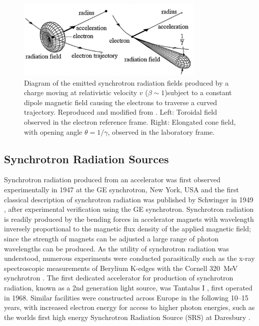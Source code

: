 \documentclass[../main.tex]{subfiles}
\begin{document}
\begin{figure}[!h]
\centering
\includegraphics[width=0.8\textwidth]{Figures/Introduction/Synchrotron_Radiation_Diagram.pdf}
\caption{Diagram of the emitted synchrotron radiation fields produced by a charge moving at relativistic velocity $v$ ($\beta\sim 1$)subject to a constant dipole magnetic field causing the electrons to traverse a curved trajectory. Reproduced and modified from \cite{eberhardt2015synchrotron}. Left: Toroidal field observed in the electron reference frame. Right: Elongated cone field, with opening angle $\theta = 1/\gamma$, observed in the laboratory frame.}
\label{fig:synchrotron_radiation_diagram}
\end{figure}

\subsection{Synchrotron Radiation Sources}

Synchrotron radiation produced from an accelerator was first observed experimentally in 1947 at the GE synchrotron, New York, USA \cite{elder1948radiation} and the first classical description of synchrotron radiation was published by Schwinger in 1949 \cite{schwinger1949classical}, after experimental verification using the GE synchrotron. Synchrotron radiation is readily produced by the bending forces in accelerator magnets with wavelength inversely proportional to the magnetic flux density of the applied magnetic field; since the strength of magnets can be adjusted a large range of photon wavelengths can be produced. As the utility of synchrotron radiation was understood, numerous experiments were conducted parasitically such as the x-ray spectroscopic measurements of Berylium K-edges with the Cornell 320~\si{\mega\electronvolt} synchrotron \cite{johnston1954absorption}. The first dedicated accelerator for production of synchrotron radiation, known as a 2nd generation light source, was Tantalus I \cite{rowe1973tantalus}, first operated in 1968. Similar facilities were constructed across Europe in the following 10--15 years, with increased electron energy for access to higher photon energies, such as the worlds first high energy Synchrotron Radiation Source (SRS) at Daresbury \cite{munro2019fifty,robinson1981experiments}. 
\end{document}
